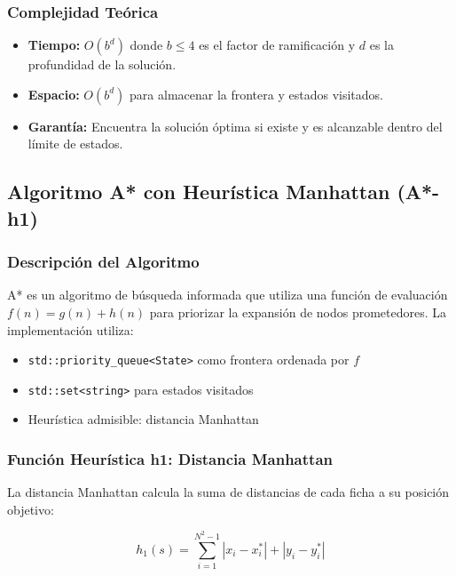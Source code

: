 \documentclass[12pt,a4paper]{article}
\begin{document}
\subsubsection{Complejidad Teórica}

\begin{itemize}
    \item \textbf{Tiempo:} $O(b^d)$ donde $b \leq 4$ es el factor de ramificación y $d$ es la profundidad de la solución.
    \item \textbf{Espacio:} $O(b^d)$ para almacenar la frontera y estados visitados.
    \item \textbf{Garantía:} Encuentra la solución óptima si existe y es alcanzable dentro del límite de estados.
\end{itemize}

\subsection{Algoritmo A* con Heurística Manhattan (A*-h1)}

\subsubsection{Descripción del Algoritmo}

A* es un algoritmo de búsqueda informada que utiliza una función de evaluación $f(n) = g(n) + h(n)$ para priorizar la expansión de nodos prometedores. La implementación utiliza:

\begin{itemize}
    \item \texttt{std::priority\_queue<State>} como frontera ordenada por $f$
    \item \texttt{std::set<string>} para estados visitados
    \item Heurística admisible: distancia Manhattan
\end{itemize}

\subsubsection{Función Heurística h1: Distancia Manhattan}

La distancia Manhattan calcula la suma de distancias de cada ficha a su posición objetivo:

\begin{equation}
h_1(s) = \sum_{i=1}^{N^2-1} |x_i - x_i^*| + |y_i - y_i^*|
\end{equation}
\end{document}
